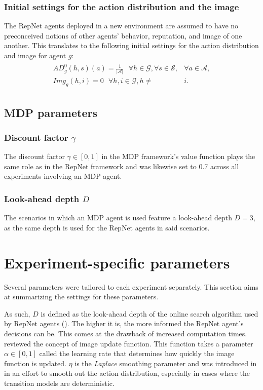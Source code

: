 \subsubsection{Initial settings for the action distribution and the image}
The RepNet agents deployed in a new environment are assumed to have no preconceived notions of other agents' behavior, reputation, and image of one another. This translates to the following initial settings for the action distribution and image for agent $g$:
\begin{align}
\begin{split}
    AD_g^0(h,s)(a) = \frac{1}{|\mathcal{A}|} \,\,\,\, \forall h \in \mathcal{G}, \forall s \in \mathcal{S}, &\forall a \in \mathcal{A},
    \\Img_g(h,i) = 0 \,\,\,\, \forall h, i \in \mathcal{G}, h \neq &i.
\end{split}
\end{align}

\subsection{MDP parameters}
\subsubsection{Discount factor $\gamma$}
The discount factor $\gamma \in [0,1]$ in the MDP framework's value function plays the same role as in the RepNet framework and was likewise set to 0.7 across all experiments involving an MDP agent.

\subsubsection{Look-ahead depth $D$}
The scenarios in which an MDP agent is used feature a look-ahead depth $D = 3$, as the same depth is used for the RepNet agents in said scenarios.


\section{Experiment-specific parameters}
\label{sec:specif}
Several parameters were tailored to each experiment separately. This section aims at summarizing the settings for these parameters. 

As such, $D$ is defined as the look-ahead depth of the online search algorithm used by RepNet agents (). The higher it is, the more informed the RepNet agent's decisions can be. This comes at the drawback of increased computation times.  reviewed the concept of image update function. This function takes a parameter $\alpha \in [0,1]$ called the learning rate that determines how quickly the image function is updated. $\eta$ is the \textit{Laplace} smoothing parameter and was introduced in  in an effort to smooth out the action distribution, especially in cases where the transition models are deterministic.

